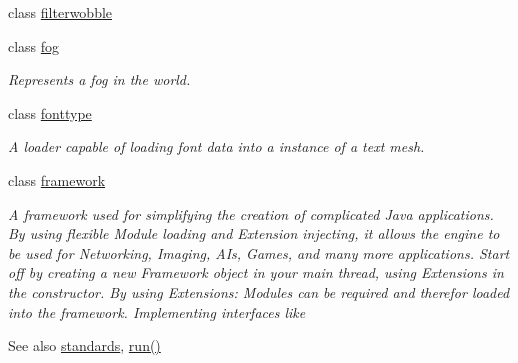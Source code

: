 \begin{DoxyCompactItemize}
\item 
class \hyperlink{classflounder_1_1filterwobble}{filterwobble}
\item 
class \hyperlink{classflounder_1_1fog}{fog}
\begin{DoxyCompactList}\small\item\em Represents a fog in the world. \end{DoxyCompactList}\item 
class \hyperlink{classflounder_1_1fonttype}{fonttype}
\begin{DoxyCompactList}\small\item\em A loader capable of loading font data into a instance of a text mesh. \end{DoxyCompactList}\item 
class \hyperlink{classflounder_1_1framework}{framework}
\begin{DoxyCompactList}\small\item\em A framework used for simplifying the creation of complicated Java applications. By using flexible Module loading and Extension injecting, it allows the engine to be used for Networking, Imaging, A\+Is, Games, and many more applications. Start off by creating a new Framework object in your main thread, using Extensions in the constructor. By using Extensions\+: Modules can be required and therefor loaded into the framework. Implementing interfaces like \begin{DoxySeeAlso}{See also}
\hyperlink{classflounder_1_1standards}{standards}, \hyperlink{classflounder_1_1framework_aa3a73c8e8f5f0c6ccef3e4de89982434}{run()}



\end{DoxySeeAlso}
\end{DoxyCompactList}
\end{DoxyCompactItemize}
